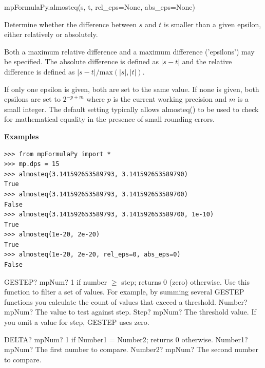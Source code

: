 \vspace{0.3cm}


mpFormulaPy.almosteq(s, t, rel\_eps=None, abs\_eps=None)

\vpara
Determine whether the difference between $s$ and $t$ is smaller than a given epsilon, either relatively or absolutely.

\vpara
Both a maximum relative difference and a maximum difference ('epsilons') may be specified. The absolute difference is defined as $|s-t|$ and the relative difference is defined as $|s-t|/\text{max}(|s|,|t|)$.

\vpara
If only one epsilon is given, both are set to the same value. If none is given, both epsilons are set to $2^{-p+m}$ where $p$ is the current working precision and $m$ is a small integer. The default setting typically allows almosteq() to be used to check for mathematical equality in the presence of small rounding errors.

\vpara
\textbf{Examples}

\begin{lstlisting}
>>> from mpFormulaPy import *
>>> mp.dps = 15
>>> almosteq(3.141592653589793, 3.141592653589790)
True
>>> almosteq(3.141592653589793, 3.141592653589700)
False
>>> almosteq(3.141592653589793, 3.141592653589700, 1e-10)
True
>>> almosteq(1e-20, 2e-20)
True
>>> almosteq(1e-20, 2e-20, rel_eps=0, abs_eps=0)
False
\end{lstlisting}



\vspace{0.6cm}

\begin{mpFunctionsExtract}
	\mpWorksheetFunctionTwoNotImplemented
	{GESTEP? mpNum?  1 if number $\geq$ step; returns 0 (zero) otherwise. Use this function to filter a set of values. For example, by summing several GESTEP functions you calculate the count of values that exceed a threshold.}
	{Number? mpNum? The value to test against step.}
	{Step? mpNum? The threshold value. If you omit a value for step, GESTEP uses zero.}
\end{mpFunctionsExtract}



\vspace{0.6cm}

\begin{mpFunctionsExtract}
	\mpWorksheetFunctionTwoNotImplemented
	{DELTA? mpNum?  1 if Number1 = Number2; returns 0 otherwise.}
	{Number1? mpNum? The first number to compare.}
	{Number2? mpNum? The second number to compare.}
\end{mpFunctionsExtract}


